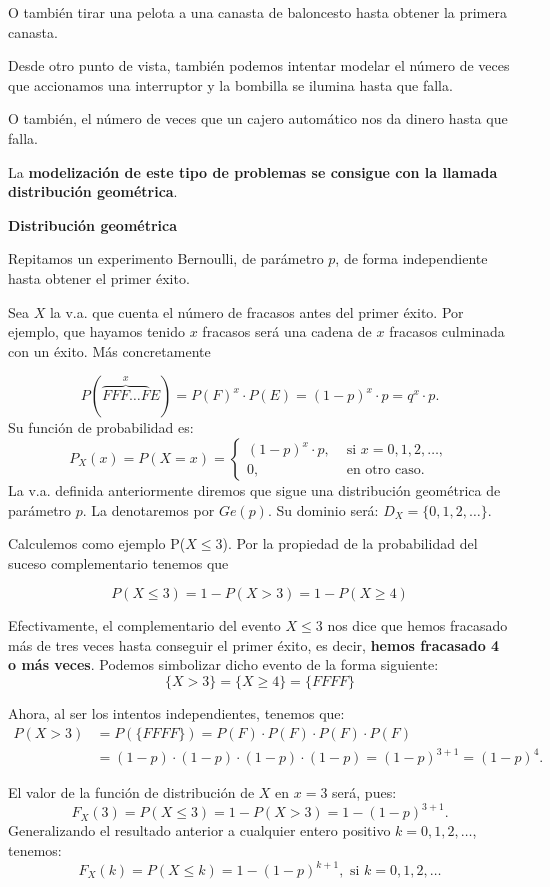 \documentclass[
  letterpaper,
  DIV=11,
  numbers=noendperiod]{scrreprt}
\begin{document}
O también tirar una pelota a una canasta de baloncesto hasta obtener la
primera canasta.

Desde otro punto de vista, también podemos intentar modelar el número de
veces que accionamos una interruptor y la bombilla se ilumina hasta que
falla.

O también, el número de veces que un cajero automático nos da dinero
hasta que falla.

La \textbf{modelización de este tipo de problemas se consigue con la
llamada distribución geométrica}.

\textbf{Distribución geométrica}

Repitamos un experimento Bernoulli, de parámetro \(p\), de forma
independiente hasta obtener el primer éxito.

Sea \(X\) la v.a. que cuenta el número de fracasos antes del primer
éxito. Por ejemplo, que hayamos tenido \(x\) fracasos será una cadena de
\(x\) fracasos culminada con un éxito. Más concretamente

\[P(\overbrace{FFF\ldots F}^{x}E)=P(F)^{x}\cdot P(E)=(1-p)^{x}\cdot p=q^{x}\cdot p.\]
Su función de probabilidad es: \[
P_X(x)=P(X=x)=\left\{\begin{array}{ll}
(1-p)^{x}\cdot p, & \mbox{ si } x=0,1,2,\ldots,\\
0, &\mbox{ en otro caso.}
\end{array}\right.
\] La v.a. definida anteriormente diremos que sigue una distribución
geométrica de parámetro \(p\). La denotaremos por \(Ge(p)\). Su dominio
será: \(D_X=\{0,1,2,\ldots\}\).

Calculemos como ejemplo P(\(X\leq 3\)). Por la propiedad de la
probabilidad del suceso complementario tenemos que

\[
P(X\leq 3 )=1-P(X> 3)=1-P(X\geq 4)
\]

Efectivamente, el complementario del evento \(X\leq 3\) nos dice que
hemos fracasado más de tres veces hasta conseguir el primer éxito, es
decir, \textbf{hemos fracasado 4 o más veces}. Podemos simbolizar dicho
evento de la forma siguiente: \[
\{X>3\}=\{X\geq 4\}= \{FFFF\}
\]

Ahora, al ser los intentos independientes, tenemos que: \[
\begin{array}{ll}
P(X>3) & =  P(\{FFFF\})= P(F)\cdot P(F)\cdot P(F)\cdot P(F)\\
&= (1-p)\cdot (1-p)\cdot (1-p)\cdot (1-p)= (1-p)^{3+1}=(1-p)^{4}.
\end{array}
\]

El valor de la función de distribución de \(X\) en \(x=3\) será, pues:
\[F_X(3)=P(X\leq 3)=1-P(X>3)=1-(1-p)^{3+1}.\] Generalizando el resultado
anterior a cualquier entero positivo \(k=0,1,2,\ldots\), tenemos:
\[F_X(k)=P(X\leq k)=1-(1-p)^{k+1},\mbox{ si } k=0,1,2,\ldots\]
\end{document}
